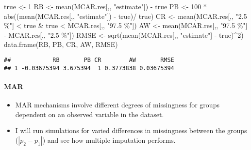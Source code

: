 \documentclass[
]{article}
\newenvironment{Shaded}{\begin{snugshade}}{\end{snugshade}}
\newcommand{\DecValTok}[1]{\textcolor[rgb]{0.00,0.00,0.81}{#1}}
\newcommand{\FunctionTok}[1]{\textcolor[rgb]{0.00,0.00,0.00}{#1}}
\newcommand{\NormalTok}[1]{#1}
\newcommand{\OtherTok}[1]{\textcolor[rgb]{0.56,0.35,0.01}{#1}}
\newcommand{\SpecialCharTok}[1]{\textcolor[rgb]{0.00,0.00,0.00}{#1}}
\newcommand{\StringTok}[1]{\textcolor[rgb]{0.31,0.60,0.02}{#1}}
\providecommand{\tightlist}{%
  \setlength{\itemsep}{0pt}\setlength{\parskip}{0pt}}
\begin{document}
\begin{Shaded}
\begin{Highlighting}[]
\NormalTok{true }\OtherTok{\textless{}{-}} \DecValTok{1}
\NormalTok{RB }\OtherTok{\textless{}{-}} \FunctionTok{mean}\NormalTok{(MCAR.res[,, }\StringTok{"estimate"}\NormalTok{]) }\SpecialCharTok{{-}}\NormalTok{ true}
\NormalTok{PB }\OtherTok{\textless{}{-}} \DecValTok{100} \SpecialCharTok{*} \FunctionTok{abs}\NormalTok{((}\FunctionTok{mean}\NormalTok{(MCAR.res[,, }\StringTok{"estimate"}\NormalTok{]) }\SpecialCharTok{{-}}\NormalTok{ true)}\SpecialCharTok{/}\NormalTok{ true)}
\NormalTok{CR }\OtherTok{\textless{}{-}} \FunctionTok{mean}\NormalTok{(MCAR.res[,, }\StringTok{"2.5 \%"}\NormalTok{] }\SpecialCharTok{\textless{}}\NormalTok{ true }\SpecialCharTok{\&}\NormalTok{ true }\SpecialCharTok{\textless{}}\NormalTok{ MCAR.res[,, }\StringTok{"97.5 \%"}\NormalTok{])}
\NormalTok{AW }\OtherTok{\textless{}{-}} \FunctionTok{mean}\NormalTok{(MCAR.res[,, }\StringTok{"97.5 \%"}\NormalTok{] }\SpecialCharTok{{-}}\NormalTok{ MCAR.res[,, }\StringTok{"2.5 \%"}\NormalTok{])}
\NormalTok{RMSE }\OtherTok{\textless{}{-}} \FunctionTok{sqrt}\NormalTok{(}\FunctionTok{mean}\NormalTok{(MCAR.res[,, }\StringTok{"estimate"}\NormalTok{] }\SpecialCharTok{{-}}\NormalTok{ true)}\SpecialCharTok{\^{}}\DecValTok{2}\NormalTok{)}
\FunctionTok{data.frame}\NormalTok{(RB, PB, CR, AW, RMSE)}
\end{Highlighting}
\end{Shaded}

\begin{verbatim}
##            RB       PB CR        AW       RMSE
## 1 -0.03675394 3.675394  1 0.3773838 0.03675394
\end{verbatim}

\hypertarget{mar}{%
\paragraph{MAR}\label{mar}}

\begin{itemize}
\tightlist
\item
  MAR mechanisms involve different degrees of missingness for groups
  dependent on an observed variable in the dataset.
\item
  I will run simulations for varied differences in missingness between
  the groups (\(|p_2 - p_1|\)) and see how multiple imputation performs.
\end{itemize}
\end{document}
